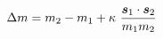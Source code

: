 \begin{equation}
\Delta m= m_2-m_1 + \kappa~\frac{\mbox{\boldmath$s$}_1 \cdot \mbox{\boldmath$s$}_2}{m_1 m_2}
\end{equation}

